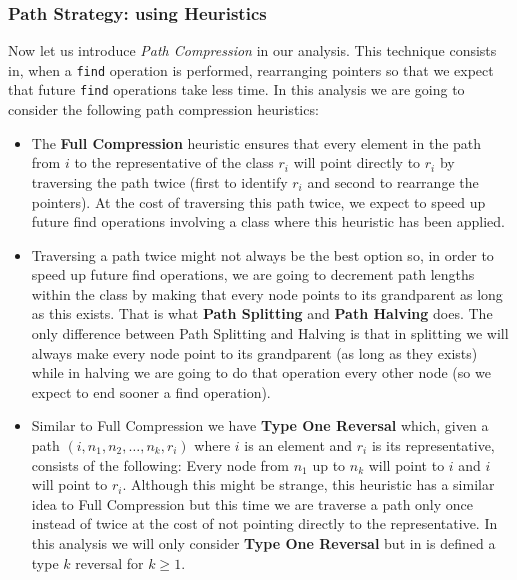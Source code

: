 



\subsubsection{Path Strategy: using Heuristics}

Now let us introduce \textit{Path Compression} in our analysis. This technique consists in, when a \texttt{find} operation is performed, rearranging pointers so that we expect that future \texttt{find} operations take less time. In this analysis we are going to consider the following path compression heuristics:

\begin{itemize}
    \item The \textbf{Full Compression} heuristic ensures that every element in the path from \( i \) to the representative of the class \( r_i \) will point directly to \( r_i \) by traversing the path twice (first to identify \( r_i \) and second to rearrange the pointers). At the cost of traversing this path twice, we expect to speed up future find operations involving a class where this heuristic has been applied. 
    \item Traversing a path twice might not always be the best option so, in order to speed up future find operations, we are going to decrement path lengths within the class by making that every node points to its grandparent as long as this exists. That is what \textbf{Path Splitting} and \textbf{Path Halving} does. The only difference between Path Splitting and Halving is that in splitting we will always make every node point to its grandparent (as long as they exists) while in halving we are going to do that operation every other node (so we expect to end sooner a find operation).
    \item Similar to Full Compression we have \textbf{Type One Reversal} which, given a path $(i, n_1, n_2, \ldots, n_k, r_i)$ where $i$ is an element and $r_i$ is its representative, consists of the following: Every node from $n_1$ up to $n_k$ will point to $i$ and $i$ will point to $r_i$. Although this might be strange, this heuristic has a similar idea to Full Compression but this time we are traverse a path only once instead of twice at the cost of not pointing directly to the representative. In this analysis we will only consider \textbf{Type One Reversal} but in \cite{tarjan1984worst} is defined a type $k$ reversal for $k \geq 1$.
\end{itemize}

